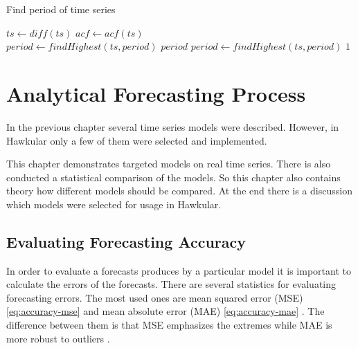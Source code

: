     \begin{algorithm}
        \caption{Find period of time series} \label{alg:period-find}
        \begin{algorithmic}[1]
             
                \State $ts \gets diff(ts)$ 
            \EndIf
            \State $acf \gets acf(ts)$ \\
            \State $period \gets findHighest(ts, period)$
                    \State \Return $period$
                \EndIf
              \State $period \gets findHighest(ts, period)$
            \EndWhile
            \State \Return $1$
        \EndFunction
        \end{algorithmic}
    \end{algorithm}

\chapter{Analytical Forecasting Process} \label{chap:models-demonstration}
In the previous chapter several time series models were described. However, in Hawkular only a few of them were
selected and implemented.

This chapter demonstrates targeted models on real time series. There is also conducted a
statistical comparison of the models. So this chapter also contains theory how different models should be compared. At
the end there is a discussion which models were selected for usage in Hawkular.

    \section{Evaluating Forecasting Accuracy} \label{sec:mse-mae}
    In order to evaluate a forecasts produces by a particular model it is important to calculate the errors of the
    forecasts. There are several statistics for evaluating forecasting errors. The most used ones are mean squared
    error (MSE) \ref{eq:accuracy-mse} and mean absolute error (MAE) \ref{eq:accuracy-mae} \cite{statistika}. The
    difference between them is that MSE emphasizes the extremes while MAE is more robust to outliers
    \cite{hyndman-forecasting}.

